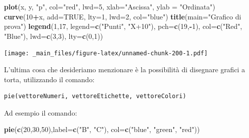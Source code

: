 \documentclass[a4paper,12pt,oneside]{book}
\newenvironment{Shaded}{\begin{snugshade}}{\end{snugshade}}
\newcommand{\KeywordTok}[1]{\textcolor[rgb]{0.13,0.29,0.53}{\textbf{#1}}}
\newcommand{\DataTypeTok}[1]{\textcolor[rgb]{0.13,0.29,0.53}{#1}}
\newcommand{\DecValTok}[1]{\textcolor[rgb]{0.00,0.00,0.81}{#1}}
\newcommand{\StringTok}[1]{\textcolor[rgb]{0.31,0.60,0.02}{#1}}
\newcommand{\OtherTok}[1]{\textcolor[rgb]{0.56,0.35,0.01}{#1}}
\newcommand{\OperatorTok}[1]{\textcolor[rgb]{0.81,0.36,0.00}{\textbf{#1}}}
\newcommand{\NormalTok}[1]{#1}
\theoremstyle{definition}
\theoremstyle{definition}
\theoremstyle{definition}
\theoremstyle{remark}
\begin{document}
\begin{Shaded}
\begin{Highlighting}[]
\KeywordTok{plot}\NormalTok{(x, y, }\StringTok{"p"}\NormalTok{, }\DataTypeTok{col=}\StringTok{"red"}\NormalTok{, }\DataTypeTok{lwd=}\DecValTok{5}\NormalTok{, }\DataTypeTok{xlab=}\StringTok{"Ascissa"}\NormalTok{, }
       \DataTypeTok{ylab =} \StringTok{"Ordinata"}\NormalTok{)}
\KeywordTok{curve}\NormalTok{(}\DecValTok{10}\OperatorTok{+}\NormalTok{x, }\DataTypeTok{add=}\OtherTok{TRUE}\NormalTok{, }\DataTypeTok{lty=}\DecValTok{1}\NormalTok{, }\DataTypeTok{lwd=}\DecValTok{2}\NormalTok{, }\DataTypeTok{col=}\StringTok{"blue"}\NormalTok{)}
\KeywordTok{title}\NormalTok{(}\DataTypeTok{main=}\StringTok{"Grafico di prova"}\NormalTok{)}
\KeywordTok{legend}\NormalTok{(}\DecValTok{1}\NormalTok{,}\DecValTok{17}\NormalTok{, }\DataTypeTok{legend=}\KeywordTok{c}\NormalTok{(}\StringTok{"Punti"}\NormalTok{, }\StringTok{"X+10"}\NormalTok{), }\DataTypeTok{pch=}\KeywordTok{c}\NormalTok{(}\DecValTok{19}\NormalTok{,}\OperatorTok{-}\DecValTok{1}\NormalTok{), }
  \DataTypeTok{col=}\KeywordTok{c}\NormalTok{(}\StringTok{"Red"}\NormalTok{, }\StringTok{"Blue"}\NormalTok{), }\DataTypeTok{lwd=}\KeywordTok{c}\NormalTok{(}\DecValTok{3}\NormalTok{,}\DecValTok{3}\NormalTok{), }\DataTypeTok{lty=}\KeywordTok{c}\NormalTok{(}\DecValTok{0}\NormalTok{,}\DecValTok{1}\NormalTok{))}
\end{Highlighting}
\end{Shaded}

\texttt{[image: \_main\_files/figure-latex/unnamed-chunk-200-1.pdf]}

L'ultima cosa che desideriamo menzionare è la possibilità di disegnare
grafici a torta, utilizzando il comando:

\begin{verbatim}
pie(vettoreNumeri, vettoreEtichette, vettoreColori)
\end{verbatim}

Ad esempio il comando:

\begin{Shaded}
\begin{Highlighting}[]
\KeywordTok{pie}\NormalTok{(}\KeywordTok{c}\NormalTok{(}\DecValTok{20}\NormalTok{,}\DecValTok{30}\NormalTok{,}\DecValTok{50}\NormalTok{),}\DataTypeTok{label=}\KeywordTok{c}\NormalTok{(}\StringTok{"B"}\NormalTok{, }\StringTok{"C"}\NormalTok{),}
        \DataTypeTok{col=}\KeywordTok{c}\NormalTok{(}\StringTok{"blue"}\NormalTok{, }\StringTok{"green"}\NormalTok{, }\StringTok{"red"}\NormalTok{))}
\end{Highlighting}
\end{Shaded}
\end{document}
